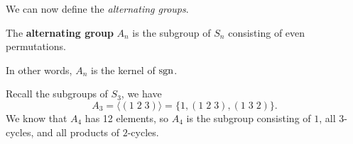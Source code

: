 We can now define the \emph{alternating groups}.

\begin{definition}[]
    The \textbf{alternating group} $A_n$ is the subgroup of $S_n$
    consisting of even permutations.
\end{definition}

\begin{remark}
    In other words, $A_n$ is the kernel of $\operatorname{sgn}$.
\end{remark}

\begin{example}
    Recall the subgroups of $S_3$, we have
    \[
        A_3 = \langle (1\;2\;3) \rangle = \{1, (1\;2\;3), (1\;3\;2)\}.
    \]
    We know that $A_4$ has 12 elements, so $A_4$ is the subgroup consisting
    of $1$, all $3$-cycles, and all products of $2$-cycles.
\end{example}
